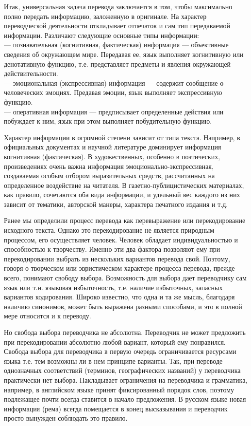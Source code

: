 Итак, универсальная задача перевода заключается в том, чтобы максимально полно передать информацию, заложенную в оригинале. На характер переводческой деятельности откладывает отпечаток и сам тип передаваемой информации. Различают следующие основные типы информации:
\\
--- познавательная (когнитивная, фактическая) информация --- объективные сведения об окружающем мире. Передавая ее, язык выполняет когнитивную или денотативную функцию, т.е. представляет предметы и явления окружающей действительности.
\\
--- эмоциональная (экспрессивная) информация --- содержит сообщение о человеческих эмоциях. Предавая эмоции, язык выполняет экспрессивную функцию.
\\
--- оперативная информация --- предписывает определенные действия или побуждает к ним, язык при этом выполняет побудительную функцию.

Характер информации в огромной степени зависит от типа текста. Например, в официальных документах и научной литературе доминирует информация когнитивная (фактическая). В художественных, особенно в поэтических, произведениях очень важна информация эмоционально-экспрессивная, создаваемая особым отбором выразительных средств, рассчитанных на определенное воздействие на читателя. В газетно-публицистических материалах, как правило, сочетаются оба вида информации, и удельный вес каждого из них зависит от тематики, авторской манеры, характера печатного издания и т.д.

Ранее мы определили процесс перевода как перевыражение или перекодирование исходного текста. Однако это перекодирование не является природным процессом, его осуществляет человек. Человек обладает индивидуальностью и способностью к творчеству. Именно эти два фактора позволяют ему при перекодировании выбрать из нескольких вариантов перевода свой. Поэтому, говоря о творческом или эвристическом характере процесса перевода, прежде всего, понимают свободу выбора. Возможность для выбора дает переводчику сам язык или т.н. языковая избыточность, т.е. наличие избыточных, запасных вариантов кодирования. Широко известно, что одна и та же мысль, благодаря наличию синонимов, может быть выражена разными способами, и это в полной мере относится и к переводу.

Но свобода выбора переводчика не абсолютна. Переводчик не может предложить при перекодировании абсолютно любой вариант, который ему понравился. Свобода выбора для переводчика в первую очередь ограничивается ресурсами языка т.е. тем возможны ли в нем принципе варианты. Так, при переводе однозначных соответствий (терминов, географических названий) у переводчика практически нет выбора. Накладывает ограничения на переводчика и грамматика, например, в английском языке принят фиксированный порядок слов, поэтому подлежащее почти всегда ставится в начало предложения. В русском языке новая информация (рема) всегда помещается в конец высказывания и переводчик просто вынужден соблюдать это правило.

